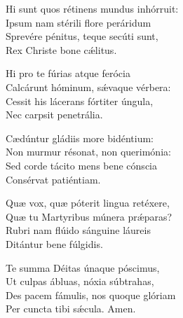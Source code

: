 Hi sunt quos rétinens mundus inhórruit:\\
I\-psum nam stérili flore peráridum\\
Sprevére pénitus, teque secúti sunt,\\
Rex Christe bone cǽlitus.

Hi pro te fúrias atque ferócia\\
Calcárunt hóminum, sǽvaque vérbera:\\
Cessit his lácerans fórtiter úngula,\\
Nec carpsit penetrália.

Cædúntur gládiis more bidéntium:\\
Non murmur résonat, non querimónia:\\
Sed corde tácito mens bene cónscia\\
Consérvat patiéntiam.

Quæ vox, quæ póterit lingua retéxere,\\
Quæ tu Martyribus múnera prǽparas?\\
Rubri nam flúido sánguine láureis\\
Ditántur bene fúlgidis.

Te summa Déitas únaque póscimus,\\
Ut culpas ábluas, nóxia súbtrahas,\\
Des pacem fámulis, nos quoque glóriam\\
Per cun\-cta tibi sǽcula.
Amen.